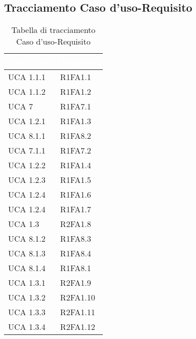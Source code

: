 \subsection{Tracciamento Caso d'uso-Requisito}
{
\renewcommand{\arraystretch}{1.5}
\centering
\begin{longtable}{ C{4cm} C{4cm}}
\caption{Tabella di tracciamento Caso d'uso-Requisito}\\
\textcolor{white}{\textbf{Caso d'uso}} & \textcolor{white}{\textbf{Requisito}}\\	
\endhead


UCA 1.1.1 & R1FA1.1\\

UCA 1.1.2 & R1FA1.2\\

UCA 7 & R1FA7.1\\

UCA 1.2.1 & R1FA1.3\\

UCA 8.1.1 & R1FA8.2\\

UCA 7.1.1 & R1FA7.2\\

UCA 1.2.2 & R1FA1.4\\

UCA 1.2.3 & R1FA1.5\\

UCA 1.2.4 & R1FA1.6\\

UCA 1.2.4 & R1FA1.7\\


UCA 1.3 & R2FA1.8\\

UCA 8.1.2 & R1FA8.3\\

UCA 8.1.3 & R1FA8.4\\

UCA 8.1.4 & R1FA8.1\\

UCA 1.3.1 & R2FA1.9\\

UCA 1.3.2 & R2FA1.10\\

UCA 1.3.3 & R2FA1.11\\

UCA 1.3.4 & R2FA1.12\\


\end{longtable}}
